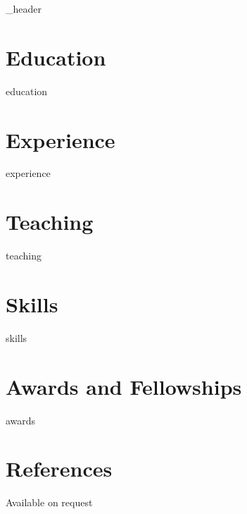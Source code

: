 \documentclass[letter,10pt]{article}
\author{Stanley Barrell-Kane}
\begin{document}
{_header}
\vspace*{10pt}

\section{Education}
{education}
\vspace*{10pt}

\section{Experience}
\vspace*{3pt}
{experience}
\vspace*{10pt}

\section{Teaching}
{teaching}
\vspace*{10pt}

\section{Skills}
\vspace*{3pt}
{skills}
\vspace*{10pt}

\section{Awards and Fellowships}
\vspace*{3pt}
{awards}
\vspace*{10pt}

\section{References}
\vspace*{3pt}
{Available on request}
\end{document}
